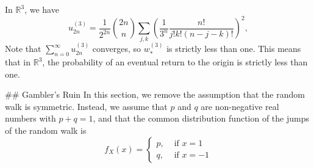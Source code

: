 In $\mathbb{R}^3$, we have 
\begin{equation*}
    u_{2 n}^{(3)}=\frac{1}{2^{2 n}}\binom{2n}{n} \sum_{j, k}\left(\frac{1}{3^{n}} \frac{n !}{j ! k !(n-j-k) !}\right)^{2}, 
\end{equation*}
Note that $\sum_{n=0}^{\infty} u_{2 n}^{(3)}$ converges, so $w_{*}^{(3)}$ is strictly less than one. This means that in $\mathbb{R}^3$, the probability of an eventual return to the origin is strictly less than one.


## Gambler’s Ruin
In this section, we remove the assumption that the random walk is symmetric. Instead, we assume that $p$ and $q$ are non-negative real numbers with $p + q = 1$, and that the common distribution function of the jumps of the random walk is
\begin{equation*}
    f_{X}(x)=\left\{\begin{array}{ll}{p,} & {\text { if } x=1} \\ {q,} & {\text { if } x=-1}\end{array}\right.
\end{equation*}

